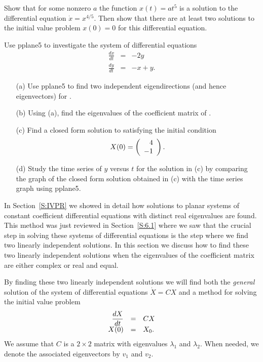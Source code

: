 \begin{exercise}  \label{c6.1.4A}
Show that for some nonzero $a$ the function $x(t)=at^5$ is a solution to the
differential equation $\dot{x}=x^{4/5}$.  Then show that there are at least
two solutions to the initial value problem $x(0)=0$ for this differential
equation.
\end{exercise}


\CEXER

\begin{exercise} \label{c6.1.4}
Use {\sf pplane5} to investigate the system
of differential equations
\begin{equation}  \label{Ex.1.4}
\begin{array}{rcr}
\frac{dx}{dt}  & = & -2y \\
\frac{dy}{dt}  & = &  -x+y.
\end{array}
\end{equation}
\begin{itemize}
\item[(a)] Use {\sf pplane5} to find two independent eigendirections (and
hence eigenvectors) for .
\item[(b)] Using (a), find the eigenvalues of the coefficient matrix of
.
\item[(c)] Find a closed form solution to  satisfying the initial
condition
\[
X(0) = \left(\begin{array}{r} 4 \\ -1\end{array}\right).
\]
\item[(d)] Study the time series of $y$ versus $t$ for the solution in (c)
by comparing the graph of the closed form solution obtained in (c) with the
time series graph using {\sf pplane5}.
\end{itemize}
\end{exercise}




\label{S:TDM}


In Section~\ref{S:IVPR} we showed in detail how solutions to planar systems
of constant coefficient differential equations with distinct real eigenvalues
are found.  This method was just reviewed in Section~\ref{S:6.1} where we saw
that the crucial step in solving these systems of differential equations is
the step where we find two linearly independent solutions.   In this section
we discuss how to find these two linearly independent solutions when the
eigenvalues of the coefficient matrix are either complex or real and equal.

By finding these two linearly independent solutions we will find both
the {\em general\/} solution of the system of differential equations
$\dot{X}=CX$ and a method for solving the initial value
problem
\begin{equation}  \label{e:eqnA}
\begin{array}{rcl}
\displaystyle\frac{dX}{dt} & = & CX\\
X(0) & = & X_0.
\end{array}
\end{equation}
We assume that $C$ is a $2\times 2$ matrix with eigenvalues $\lambda_1$ and
$\lambda_2$.  When needed, we denote the associated eigenvectors by $v_1$ and
$v_2$.

